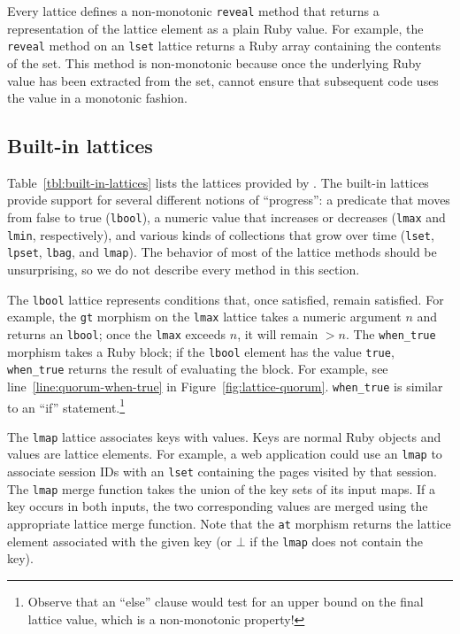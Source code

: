 Every lattice defines a non-monotonic \texttt{reveal} method that returns a
representation of the lattice element as a plain Ruby value. For example, the
\texttt{reveal} method on an \texttt{lset} lattice returns a Ruby array
containing the contents of the set. This method is non-monotonic because once the
underlying Ruby value has been extracted from the set, \lang cannot ensure that
subsequent code uses the value in a monotonic fashion.

\subsection{Built-in lattices}
\label{sec:lattice-built-ins}

Table~\ref{tbl:built-in-lattices} lists the lattices provided by \lang. The
built-in lattices provide support for several different notions of ``progress'':
a predicate that moves from false to true (\texttt{lbool}), a numeric value that
increases or decreases (\texttt{lmax} and \texttt{lmin}, respectively), and
various kinds of collections that grow over time (\texttt{lset}, \texttt{lpset},
\texttt{lbag}, and \texttt{lmap}). The behavior of most of the lattice methods
should be unsurprising, so we do not describe every method in this section.

The \texttt{lbool} lattice represents conditions that, once satisfied, remain
satisfied. For example, the \texttt{gt} morphism on the \texttt{lmax} lattice
takes a numeric argument $n$ and returns an \texttt{lbool}; once the
\texttt{lmax} exceeds $n$, it will remain $>n$. The \texttt{when\_true} morphism
takes a Ruby block; if the \texttt{lbool} element has the value \texttt{true},
\texttt{when\_true} returns the result of evaluating the block. For example, see
line~\ref{line:quorum-when-true} in
Figure~\ref{fig:lattice-quorum}. \texttt{when\_true} is similar to an ``if''
statement.\footnote{Observe that an ``else'' clause would test for an upper
  bound on the final lattice value, which is a non-monotonic property!}

The \texttt{lmap} lattice associates keys with values. Keys are normal Ruby
objects and values are lattice elements. For example, a web application could
use an \texttt{lmap} to associate session IDs with an \texttt{lset} containing
the pages visited by that session. The \texttt{lmap} merge function takes the
union of the key sets of its input maps. If a key occurs in both inputs, the two
corresponding values are merged using the appropriate lattice merge
function. Note that the \texttt{at} morphism returns the lattice element
associated with the given key (or $\bot$ if the \texttt{lmap} does not contain
the key).

